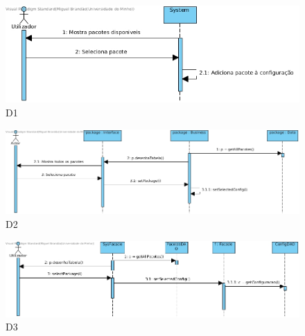 \begin{figure}[H]
    \centering
    \includegraphics[width=\textwidth]{diagramas_de_sequencia/imgs/UserSystemUC9D1.jpg}
    \caption{D1}
\end{figure}
\begin{figure}[H]
    \centering
    \includegraphics[width=\textwidth]{diagramas_de_sequencia/imgs/UserSystemUC9D2.jpg}
    \caption{D2}
\end{figure}
\begin{figure}[H]
    \centering
    \includegraphics[width=\textwidth]{diagramas_de_sequencia/imgs/UserSystemUC9D3.jpg}
    \caption{D3}
\end{figure}

